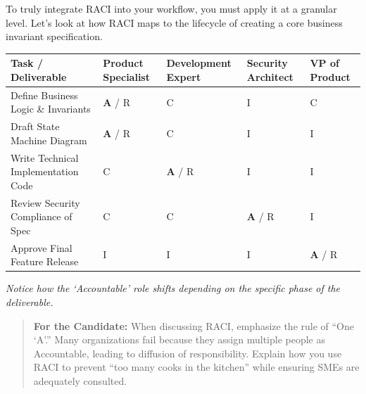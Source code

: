 To truly integrate RACI into your workflow, you must apply it at a
granular level. Let's look at how RACI maps to the lifecycle of creating
a core business invariant specification.

\begin{longtable}[]{@{}
  >{\raggedright\arraybackslash}p{}
  >{\centering\arraybackslash}p{}
  >{\centering\arraybackslash}p{}
  >{\centering\arraybackslash}p{}
  >{\centering\arraybackslash}p{}@{}}
\toprule\noalign{}
\begin{minipage}[b]{\linewidth}\raggedright
Task / Deliverable
\end{minipage} & \begin{minipage}[b]{\linewidth}\centering
Product Specialist
\end{minipage} & \begin{minipage}[b]{\linewidth}\centering
Development Expert
\end{minipage} & \begin{minipage}[b]{\linewidth}\centering
Security Architect
\end{minipage} & \begin{minipage}[b]{\linewidth}\centering
VP of Product
\end{minipage} \\
\midrule\noalign{}
\endhead
\bottomrule\noalign{}
\endlastfoot
Define Business Logic \& Invariants & \textbf{A} / R & C & I & C \\
Draft State Machine Diagram & \textbf{A} / R & C & I & I \\
Write Technical Implementation Code & C & \textbf{A} / R & I & I \\
Review Security Compliance of Spec & C & C & \textbf{A} / R & I \\
Approve Final Feature Release & I & I & I & \textbf{A} / R \\
\end{longtable}

\emph{Notice how the `Accountable' role shifts depending on the specific
phase of the deliverable.}

\begin{quote}
\textbf{For the Candidate:} When discussing RACI, emphasize the rule of
``One `A'.'' Many organizations fail because they assign multiple people
as Accountable, leading to diffusion of responsibility. Explain how you
use RACI to prevent ``too many cooks in the kitchen'' while ensuring
SMEs are adequately consulted.
\end{quote}

